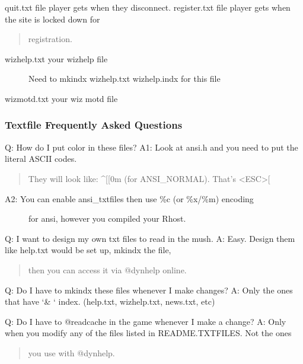 \documentclass[letterpaper,10pt,english]{sphinxmanual}
\begin{document}
\sphinxAtStartPar
quit.txt               \sphinxhyphen{} file player gets when they disconnect.
register.txt           \sphinxhyphen{} file player gets when the site is locked down for
\begin{quote}

\sphinxAtStartPar
registration.
\end{quote}
\begin{description}
\item[{wizhelp.txt            \sphinxhyphen{} your wizhelp file}] \leavevmode
\sphinxAtStartPar
{}  Need to mkindx wizhelp.txt wizhelp.indx for this file

\end{description}

\sphinxAtStartPar
wizmotd.txt            \sphinxhyphen{} your wiz motd file


\subsubsection{Textfile Frequently Asked Questions}
\label{\detokenize{maintenance:textfile-frequently-asked-questions}}
\sphinxAtStartPar
Q:  How do I put color in these files?
A1: Look at ansi.h and you need to put the literal ASCII codes.
\begin{quote}

\sphinxAtStartPar
They will look like: \textasciicircum{}{[}{[}0m (for ANSI\_NORMAL).  That’s \textless{}ESC\textgreater{}{[}
\end{quote}
\begin{description}
\item[{A2: You can enable ansi\_txtfiles then use \%c (or \%x/\%m) encoding}] \leavevmode
\sphinxAtStartPar
for ansi, however you compiled your Rhost.

\end{description}

\sphinxAtStartPar
Q:  I want to design my own txt files to read in the mush.
A:  Easy.  Design them like help.txt would be set up, mkindx the file,
\begin{quote}

\sphinxAtStartPar
then you can access it via @dynhelp online.
\end{quote}

\sphinxAtStartPar
Q:  Do I have to mkindx these files whenever I make changes?
A:  Only the ones that have ‘\& ‘ index. (help.txt, wizhelp.txt, news.txt, etc)

\sphinxAtStartPar
Q:  Do I have to @readcache in the game whenever I make a change?
A:  Only when you modify any of the files listed in README.TXTFILES.  Not the ones
\begin{quote}

\sphinxAtStartPar
you use with @dynhelp.
\end{quote}
\end{document}
